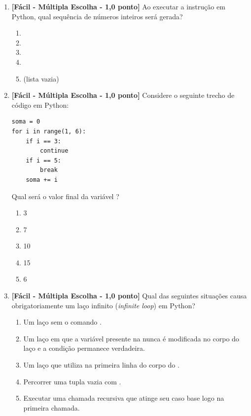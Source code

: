 \begin{enumerate}[label=\textbf{Q\arabic*.}, start=25]

\item \textbf{[Fácil - Múltipla Escolha - 1,0 ponto]} Ao executar a instrução  em Python, qual sequência de números inteiros será gerada?

\begin{enumerate}[label=\textbf{(\Alph*)}]
    \item \code{[10, 7, 4]}
    \item \code{[10, 7, 4, 1]}
    \item \code{[10, 8, 6, 4, 2]}
    \item \code{[10, 7, 4, 2]}
    \item \code{[]} (lista vazia)
\end{enumerate}



\vspace{0.4cm}

\item \textbf{[Fácil - Múltipla Escolha - 1,0 ponto]} Considere o seguinte trecho de código em Python:
\begin{verbatim}
soma = 0
for i in range(1, 6):
    if i == 3:
        continue
    if i == 5:
        break
    soma += i
\end{verbatim}
Qual será o valor final da variável ?

\begin{enumerate}[label=\textbf{(\Alph*)}]
    \item 3
    \item 7
    \item 10
    \item 15
    \item 6
\end{enumerate}



\vspace{0.4cm}

\item \textbf{[Fácil - Múltipla Escolha - 1,0 ponto]} Qual das seguintes situações causa obrigatoriamente um laço infinito (\emph{infinite loop}) em Python?

\begin{enumerate}[label=\textbf{(\Alph*)}]
    \item Um laço  sem o comando .
    \item Um laço  em que a variável presente na  nunca é modificada no corpo do laço e a condição permanece verdadeira.
    \item Um laço que utiliza  na primeira linha do corpo do .
    \item Percorrer uma tupla vazia com .
    \item Executar uma chamada recursiva que atinge seu caso base logo na primeira chamada.
\end{enumerate}


\end{enumerate}
